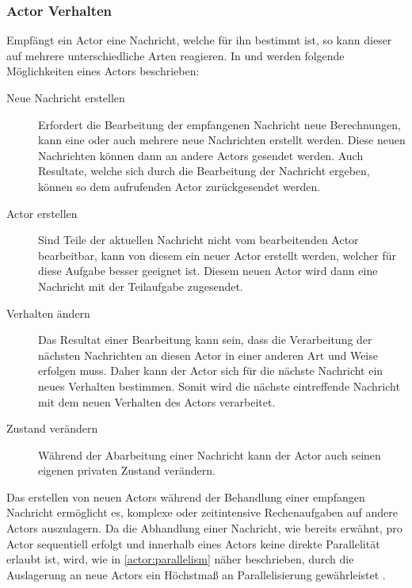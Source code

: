 \subsubsection{Actor Verhalten}
\label{actorBehaviour}
Empfängt ein Actor eine Nachricht, welche für ihn bestimmt ist, so kann dieser auf mehrere unterschiedliche Arten reagieren. In \citep{Agha1985ActorsSystems} und \citep{Vernon2015ReactiveAkka} werden folgende Möglichkeiten eines Actors beschrieben:
\begin{description}
    \item[Neue Nachricht erstellen] Erfordert die Bearbeitung der empfangenen Nachricht neue Berechnungen, kann eine oder auch mehrere neue Nachrichten erstellt werden. Diese neuen Nachrichten können dann an andere Actors gesendet werden. Auch Resultate, welche sich durch die Bearbeitung der Nachricht ergeben, können so dem aufrufenden Actor zurückgesendet werden.
    \item[Actor erstellen] Sind Teile der aktuellen Nachricht nicht vom bearbeitenden Actor bearbeitbar, kann von diesem ein neuer Actor erstellt werden, welcher für diese Aufgabe besser geeignet ist. Diesem neuen Actor wird dann eine Nachricht mit der Teilaufgabe zugesendet.
    \item[Verhalten ändern] Das Resultat einer Bearbeitung kann sein, dass die Verarbeitung der nächsten Nachrichten an diesen Actor in einer anderen Art und Weise erfolgen muss. Daher kann der Actor sich für die nächste Nachricht ein neues Verhalten bestimmen. Somit wird die nächste eintreffende Nachricht mit dem neuen Verhalten des Actors verarbeitet.
    \item[Zustand verändern] Während der Abarbeitung einer Nachricht kann der Actor auch seinen eigenen privaten Zustand verändern.
\end{description}
Das erstellen von neuen Actors während der Behandlung einer empfangen Nachricht ermöglicht es, komplexe oder zeitintensive Rechenaufgaben auf andere Actors auszulagern. Da die Abhandlung einer Nachricht, wie bereits erwähnt, pro Actor sequentiell erfolgt und innerhalb eines Actors keine direkte Parallelität erlaubt ist, wird, wie in \ref{actor:parallelism} näher beschrieben, durch die Auslagerung an neue Actors ein Höchstmaß an Parallelisierung gewährleistet \citep{Agha1985ConcurrentParallelism}.

